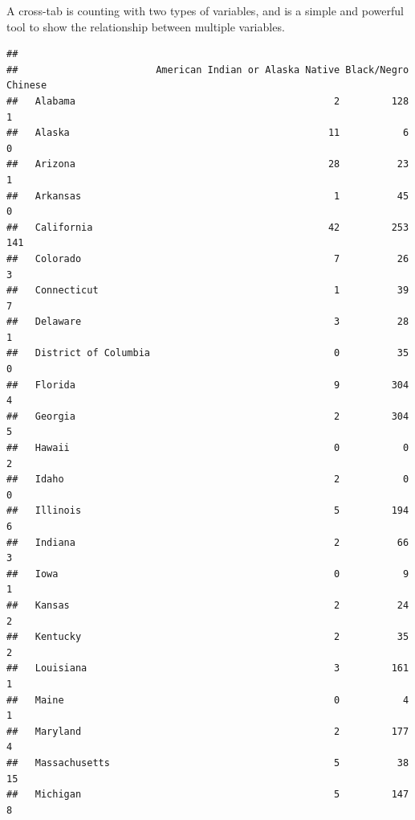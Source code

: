 \documentclass[
]{book}
\newenvironment{Shaded}{\begin{snugshade}}{\end{snugshade}}
\newcommand{\KeywordTok}[1]{\textcolor[rgb]{0.13,0.29,0.53}{\textbf{#1}}}
\newcommand{\NormalTok}[1]{#1}
\newcommand{\OperatorTok}[1]{\textcolor[rgb]{0.81,0.36,0.00}{\textbf{#1}}}
\newcommand{\StringTok}[1]{\textcolor[rgb]{0.31,0.60,0.02}{#1}}
\theoremstyle{definition}
\theoremstyle{definition}
\theoremstyle{definition}
\theoremstyle{remark}
\begin{document}
A cross-tab is counting with two types of variables, and is a simple and powerful tool to show the relationship between multiple variables.

\begin{Shaded}
\end{Shaded}

\begin{verbatim}
##                       
##                        American Indian or Alaska Native Black/Negro Chinese
##   Alabama                                             2         128       1
##   Alaska                                             11           6       0
##   Arizona                                            28          23       1
##   Arkansas                                            1          45       0
##   California                                         42         253     141
##   Colorado                                            7          26       3
##   Connecticut                                         1          39       7
##   Delaware                                            3          28       1
##   District of Columbia                                0          35       0
##   Florida                                             9         304       4
##   Georgia                                             2         304       5
##   Hawaii                                              0           0       2
##   Idaho                                               2           0       0
##   Illinois                                            5         194       6
##   Indiana                                             2          66       3
##   Iowa                                                0           9       1
##   Kansas                                              2          24       2
##   Kentucky                                            2          35       2
##   Louisiana                                           3         161       1
##   Maine                                               0           4       1
##   Maryland                                            2         177       4
##   Massachusetts                                       5          38      15
##   Michigan                                            5         147       8

\end{verbatim}
\end{document}

